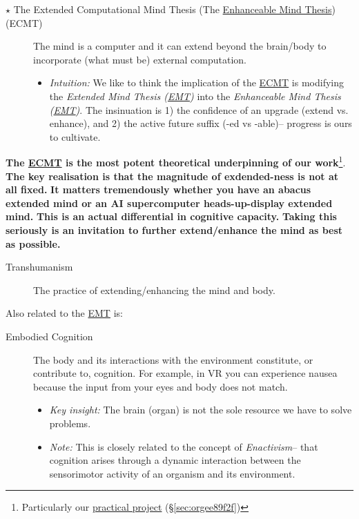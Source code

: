 \documentclass[logo,bsc,singlespacing,parskip]{infthesis}
\begin{document}
{\begin{mdframed}
\begin{description}
\item[{\(\star\) The Extended Computational Mind Thesis (The \hyperref[orgc57c877]{Enhanceable Mind Thesis}) (\label{orgb676aad}ECMT)}] The mind is a computer and it can extend beyond the brain/body to incorporate (what must be) external computation.
\begin{itemize}
\item \emph{Intuition:} We like to think the implication of the \hyperref[orgb676aad]{ECMT} is modifying the \emph{Extended Mind Thesis (\hyperref[org1e2274c]{EMT})} into the \emph{\label{orgc57c877}Enhanceable Mind Thesis (\hyperref[org1e2274c]{EMT})}.
The insinuation is 1) the confidence of an upgrade (extend vs. enhance), and 2) the active future suffix (-ed vs -able)-- progress is ours to cultivate.
\end{itemize}
\end{description}
\end{mdframed}

\textbf{The \hyperref[orgb676aad]{ECMT} is the most potent theoretical underpinning of our work}\footnote{Particularly our \hyperref[sec:orgee89f2f]{practical project} (\S \ref{sec:orgee89f2f})}.
\textbf{The key realisation is that the magnitude of exdended-ness is not at all fixed.}
\textbf{It matters tremendously whether you have an abacus extended mind or an AI supercomputer heads-up-display extended mind.}
\textbf{This is an actual differential in cognitive capacity.}
\textbf{Taking this seriously is an invitation to further extend/enhance the mind as best as possible.}

\begin{mdframed}
\begin{description}
\item[{\label{orgcf1996d}Transhumanism}] The practice of extending/enhancing the mind and body.
\end{description}
\end{mdframed}

Also related to the \hyperref[org1e2274c]{EMT} is:

\begin{mdframed}
\begin{description}
\item[{\label{org68031b0}Embodied Cognition}] The body and its interactions with the environment constitute, or contribute to, cognition.
For example, in VR you can experience nausea because the input from your eyes and body does not match.
\begin{itemize}
\item \emph{Key insight:} The brain (organ) is not the sole resource we have to solve problems.
\item \emph{Note:} This is closely related to the concept of \emph{Enactivism}-- that cognition arises through a dynamic interaction between the sensorimotor activity of an organism and its environment.
\end{itemize}
\end{description}
\end{mdframed}

}
\end{document}
